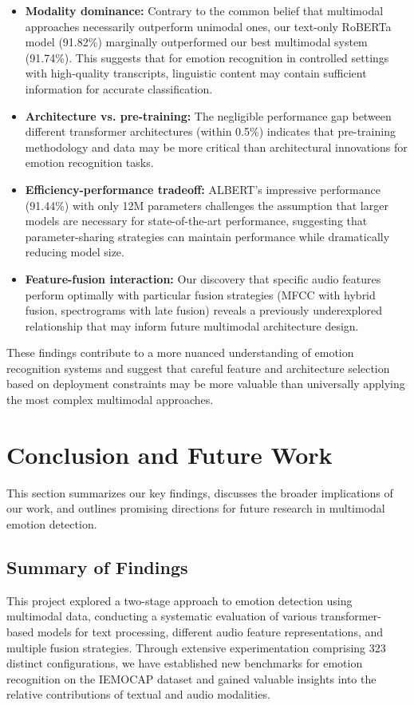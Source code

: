 \documentclass[12pt]{article}
\begin{document}
\begin{itemize}
    \item \textbf{Modality dominance:} Contrary to the common belief that multimodal approaches necessarily outperform unimodal ones, our text-only RoBERTa model (91.82\%) marginally outperformed our best multimodal system (91.74\%). This suggests that for emotion recognition in controlled settings with high-quality transcripts, linguistic content may contain sufficient information for accurate classification.
    
    \item \textbf{Architecture vs. pre-training:} The negligible performance gap between different transformer architectures (within 0.5\%) indicates that pre-training methodology and data may be more critical than architectural innovations for emotion recognition tasks.
    
    \item \textbf{Efficiency-performance tradeoff:} ALBERT's impressive performance (91.44\%) with only 12M parameters challenges the assumption that larger models are necessary for state-of-the-art performance, suggesting that parameter-sharing strategies can maintain performance while dramatically reducing model size.
    
    \item \textbf{Feature-fusion interaction:} Our discovery that specific audio features perform optimally with particular fusion strategies (MFCC with hybrid fusion, spectrograms with late fusion) reveals a previously underexplored relationship that may inform future multimodal architecture design.
\end{itemize}

These findings contribute to a more nuanced understanding of emotion recognition systems and suggest that careful feature and architecture selection based on deployment constraints may be more valuable than universally applying the most complex multimodal approaches.

\section{Conclusion and Future Work}
\label{sec:conclusion}

This section summarizes our key findings, discusses the broader implications of our work, and outlines promising directions for future research in multimodal emotion detection.

\subsection{Summary of Findings}
This project explored a two-stage approach to emotion detection using multimodal data, conducting a systematic evaluation of various transformer-based models for text processing, different audio feature representations, and multiple fusion strategies. Through extensive experimentation comprising 323 distinct configurations, we have established new benchmarks for emotion recognition on the IEMOCAP dataset and gained valuable insights into the relative contributions of textual and audio modalities.
\end{document}
